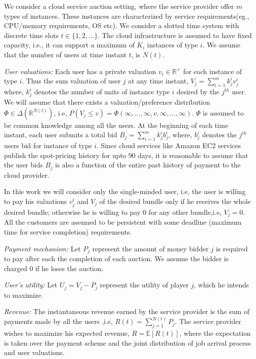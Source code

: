 \documentclass[a4paper,english,12pt]{article}
\begin{document}
We consider a cloud service auction setting, where the service provider offer $m$ types of instances. These instances are characterized by service requirements(eg., CPU/memory requirements, OS etc). We consider a slotted time system with discrete time slots $t \in \{ 1,2,... \}$. The cloud infrastructure is assumed to have fixed capacity, i.e., it can support a maximum of $K_i$ instances of type $i$. We assume that the number of users at time instant $t$, is $N(t)$. 

\textit{User valuations:} Each user has a private valuation $v_i\in\mathbb{R}^+$ for each instance of type $i$. Thus the sum valuation of user $j$ at any time instant, $V_j= \sum_{i=1}^{m}k_{j}^{i} v_{j}^{i}$ where,  $k_j^i$ denotes the number of units of instance type $i$ desired by the $j^{th}$ user. We will assume that there exists a valuation/preference distribution $\Phi \in \Delta(\mathbb{R}^{N(t)})$, i.e, $P(V_j\leq v) = \Phi(\infty,\dots,\infty,v,\infty,\dots,\infty)$. $\Phi$ is assumed to be common knowledge among all the users. At the beginning of each time instant, each user submits a total bid $B_j= \sum_{i=1}^{m}k_{j}^{i} b_{j}^{i}$, where, $b_{j}^{i}$ denotes the $j^{th}$ users bid for instance of type $i$. Since cloud services like Amazon EC2 services publish the spot-pricing history for upto 90 days, it is reasonable to assume that the user bids $B_j$ is also a function of the entire past history of payment to the cloud provider.

In this work we will consider only the single-minded user, i.e, the user is willing to pay his valuations $v_j^i$ and $V_j$ of the desired bundle only if he receives the whole desired bundle; otherwise he is willing to pay 0 for any other bundle,i.e, $V_j=0$. All the customers are assumed to be persistent with some deadline (maximum time for service completion) requirements.

\textit{Payment mechanism:} Let $P_j$ represent the amount of money bidder $j$ is required to pay after each the completion of each auction. We assume the bidder is charged 0 if he loses the auction.

\textit{User's utility:} Let $U_j=V_j - P_j$ represent the utility of player $j$, which he intends to maximize. 

\textit{Revenue:} The instantaneous revenue earned by the service provider is the sum of payments made by all the users ,i.e, $R(t)=\sum_{j=1}^{N(t)}P_j$. The service provider wishes to maximize his expected revenue, $R= \mathbb{E}[ R(t)]$, where the expectation is taken over the payment scheme and the joint distribution of job arrival process and user valuations. 
\end{document}
